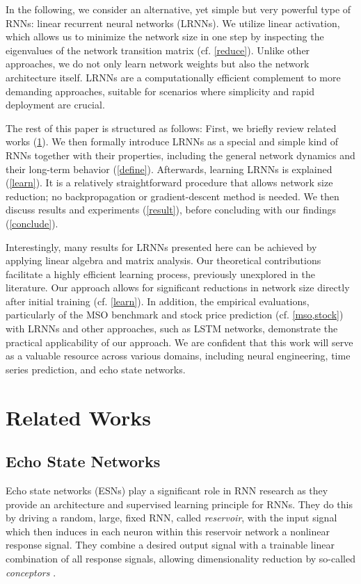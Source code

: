 \documentclass{sn-jnl}
\theoremstyle{definition}
\begin{document}
In the following, we consider an alternative, yet simple but very powerful type of RNNs: linear 
recurrent neural networks (LRNNs). We utilize linear activation, which 
allows us to minimize the network size in one step by inspecting the 
eigenvalues of the network transition matrix (cf. \cref{reduce}). 
Unlike other approaches, we do not only learn network weights but also the 
network architecture itself. LRNNs are a computationally efficient complement to more 
demanding approaches, suitable for scenarios where simplicity and rapid deployment are crucial.

The rest of this paper is structured as follows: First, we briefly review related 
works (\cref{related}). We then formally introduce LRNNs as a special and simple 
kind of RNNs together with their properties, including the general network 
dynamics and their long-term behavior (\cref{define}). Afterwards, learning 
LRNNs is explained (\cref{learn}). It is a relatively straightforward procedure 
that allows network size reduction; no backpropagation or gradient-descent 
method is needed. We then discuss results and experiments (\cref{result}), 
before concluding with our findings (\cref{conclude}).

Interestingly, many results for LRNNs presented here can be achieved by 
applying linear algebra and matrix analysis. Our theoretical contributions 
facilitate a highly efficient learning process, previously unexplored in the literature. 
Our approach allows for significant reductions in network size directly after initial training 
(cf. \cref{learn}). In addition, the empirical evaluations, particularly of the MSO 
benchmark and stock price prediction (cf. \cref{mso,stock}) with LRNNs and other 
approaches, such as LSTM networks, demonstrate the practical applicability of our approach. We 
are confident that this work will serve as a valuable resource across various domains, including 
neural engineering, time series prediction, and echo state networks.

\section{Related Works}\label{related}

\subsection{Echo State Networks}

Echo state networks (ESNs) \citep{JH04,Jae07} play a significant role in RNN
research as they provide an architecture and supervised learning principle for
RNNs. They do this by driving a random, large, fixed RNN, called
\emph{reservoir}, with the input signal which then induces in each neuron within
this reservoir network a nonlinear response signal. They combine a desired
output signal with a trainable linear combination of all response signals,
allowing dimensionality reduction by so-called \emph{conceptors} \citep{Jae14,Jae17}.
\end{document}
